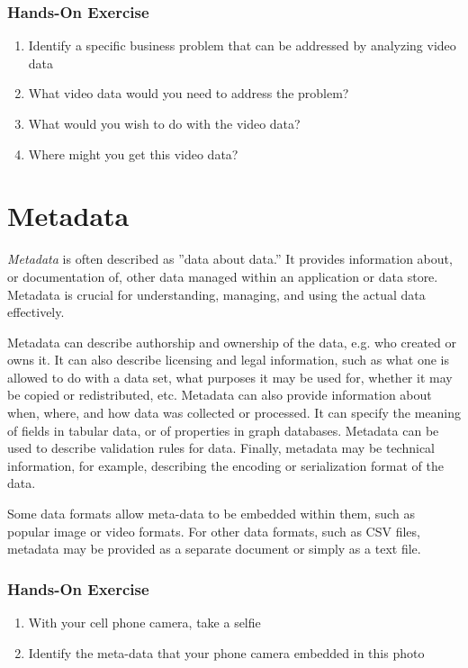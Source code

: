 \begin{tcolorbox}[colback=code]
\subsubsection*{Hands-On Exercise} 
\begin{enumerate}
	\item Identify a specific business problem that can be addressed by analyzing video data
	\item What video data would you need to address the problem?
	\item What would you wish to do with the video data?
	\item Where might you get this video data?
\end{enumerate}
\end{tcolorbox}

\section{Metadata}

\emph{Metadata} is often described as ''data about data.'' It provides information about, or documentation of, other data managed within an application or data store. Metadata is crucial for understanding, managing, and using the actual data effectively.

Metadata can describe authorship and ownership of the data, e.g. who created or owns it. It can also describe licensing and legal information, such as what one is allowed to do with a data set, what purposes it may be used for, whether it may be copied or redistributed, etc. Metadata can also provide information about when, where, and how data was collected or processed. It can specify the meaning of fields in tabular data, or of properties in graph databases. Metadata can be used to describe validation rules for data. Finally, metadata may be technical information, for example, describing the encoding or serialization format of the data. 

Some data formats allow meta-data to be embedded within them, such as popular image or video formats. For other data formats, such as CSV files, metadata may be provided as a separate document or simply as a text file.

\begin{tcolorbox}[colback=code]
\subsubsection*{Hands-On Exercise} 
\begin{enumerate}
	\item With your cell phone camera, take a selfie
	\item Identify the meta-data that your phone camera embedded in this photo
\end{enumerate}
\end{tcolorbox}

